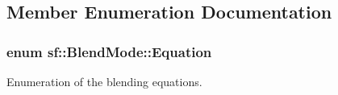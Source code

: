 \subsection{Member Enumeration Documentation}
\hypertarget{structsf_1_1_blend_mode_a7bce470e2e384c4f9c8d9595faef7c32}{
\subsubsection[{Equation}]{\setlength{\rightskip}{0pt plus 5cm}enum {\bf sf\-::\-Blend\-Mode\-::\-Equation}}}\label{structsf_1_1_blend_mode_a7bce470e2e384c4f9c8d9595faef7c32}


Enumeration of the blending equations. 


